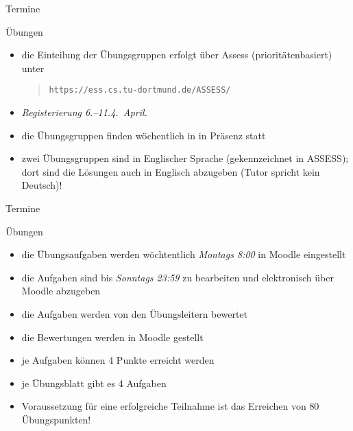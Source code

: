 \documentclass[aspectratio=1610, 11pt]{beamer}
\begin{document}
%
%
%

\begin{frame}{Termine}
	\begin{exampleblock}{\"Ubungen}
		\begin{itemize}
			\item die Einteilung der \"Ubungsgruppen erfolgt \"uber Assess (priorit\"atenbasiert) unter
				\begin{quote}
\tt https://ess.cs.tu-dortmund.de/ASSESS/
				\end{quote}
			\item \emph{Registerierung 6.--11.4.~April.}
			\item die \"Ubungsgruppen finden w\"ochentlich in \alert{in Pr\"asenz} statt
			\item zwei \"Ubungsgruppen sind in \alert{Englischer Sprache} (gekennzeichnet in ASSESS); dort sind die L\"osungen auch in Englisch abzugeben (Tutor spricht kein Deutsch)!
		\end{itemize}
	\end{exampleblock}
\end{frame}

\begin{frame}{Termine}
	\begin{exampleblock}{\"Ubungen}
		\begin{itemize}
			\item die \"Ubungsaufgaben werden w\"ochtentlich \emph{Montags 8:00} in Moodle eingestellt
			\item die Aufgaben sind bis \emph{Sonntags 23:59} zu bearbeiten und elektronisch \"uber Moodle abzugeben
			\item die Aufgaben werden von den \"Ubungsleitern bewertet
			\item die Bewertungen werden in Moodle gestellt
			\item je Aufgaben k\"onnen 4 Punkte erreicht werden
			\item je \"Ubungsblatt gibt es 4 Aufgaben
			\item Voraussetzung f\"ur eine erfolgreiche Teilnahme ist das Erreichen von \alert{80 \"Ubungspunkten!}
		\end{itemize}
	\end{exampleblock}
\end{frame}
\end{document}
